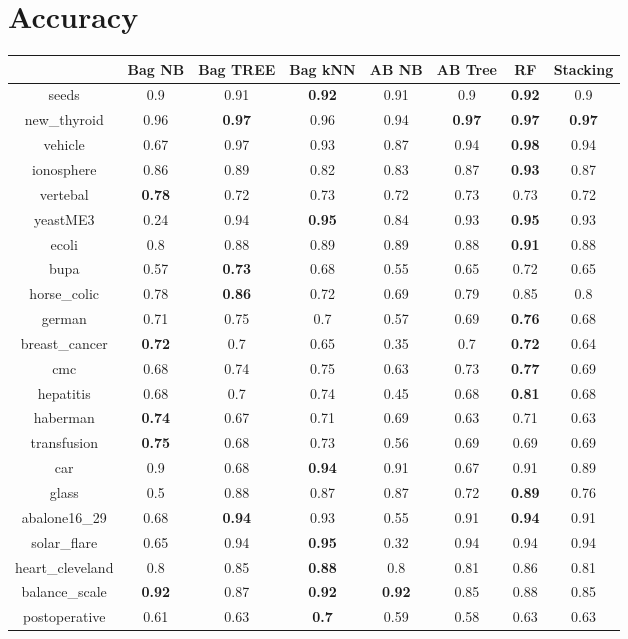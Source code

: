 \documentclass{article}%
\begin{document}
%
\normalsize%
\section*{Accuracy}%
\begin{tabular}{c|ccccccc}%
&Bag NB&Bag TREE&Bag kNN&AB NB&AB Tree&RF&Stacking\\%
\hline%
seeds&0.9&0.91&\textbf{0.92}&0.91&0.9&\textbf{0.92}&0.9\\%
new\_thyroid&0.96&\textbf{0.97}&0.96&0.94&\textbf{0.97}&\textbf{0.97}&\textbf{0.97}\\%
vehicle&0.67&0.97&0.93&0.87&0.94&\textbf{0.98}&0.94\\%
ionosphere&0.86&0.89&0.82&0.83&0.87&\textbf{0.93}&0.87\\%
vertebal&\textbf{0.78}&0.72&0.73&0.72&0.73&0.73&0.72\\%
yeastME3&0.24&0.94&\textbf{0.95}&0.84&0.93&\textbf{0.95}&0.93\\%
ecoli&0.8&0.88&0.89&0.89&0.88&\textbf{0.91}&0.88\\%
bupa&0.57&\textbf{0.73}&0.68&0.55&0.65&0.72&0.65\\%
horse\_colic&0.78&\textbf{0.86}&0.72&0.69&0.79&0.85&0.8\\%
german&0.71&0.75&0.7&0.57&0.69&\textbf{0.76}&0.68\\%
breast\_cancer&\textbf{0.72}&0.7&0.65&0.35&0.7&\textbf{0.72}&0.64\\%
cmc&0.68&0.74&0.75&0.63&0.73&\textbf{0.77}&0.69\\%
hepatitis&0.68&0.7&0.74&0.45&0.68&\textbf{0.81}&0.68\\%
haberman&\textbf{0.74}&0.67&0.71&0.69&0.63&0.71&0.63\\%
transfusion&\textbf{0.75}&0.68&0.73&0.56&0.69&0.69&0.69\\%
car&0.9&0.68&\textbf{0.94}&0.91&0.67&0.91&0.89\\%
glass&0.5&0.88&0.87&0.87&0.72&\textbf{0.89}&0.76\\%
abalone16\_29&0.68&\textbf{0.94}&0.93&0.55&0.91&\textbf{0.94}&0.91\\%
solar\_flare&0.65&0.94&\textbf{0.95}&0.32&0.94&0.94&0.94\\%
heart\_cleveland&0.8&0.85&\textbf{0.88}&0.8&0.81&0.86&0.81\\%
balance\_scale&\textbf{0.92}&0.87&\textbf{0.92}&\textbf{0.92}&0.85&0.88&0.85\\%
postoperative&0.61&0.63&\textbf{0.7}&0.59&0.58&0.63&0.63\\%
\end{tabular}
\end{document}
